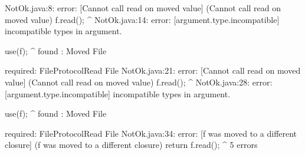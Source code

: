 \lstset{caption=New Mungo output}
\begin{code}
NotOk.java:8: error: [Cannot call read on moved value] (Cannot call read on moved value)
    f.read();
          ^
NotOk.java:14: error: [argument.type.incompatible] incompatible types in argument.

    use(f);
        ^
  found   : Moved File

  required: FileProtocol{Read} File
NotOk.java:21: error: [Cannot call read on moved value] (Cannot call read on moved value)
    f.read();
          ^
NotOk.java:28: error: [argument.type.incompatible] incompatible types in argument.

    use(f);
        ^
  found   : Moved File

  required: FileProtocol{Read} File
NotOk.java:34: error: [f was moved to a different closure] (f was moved to a different closure)
      return f.read();
             ^
5 errors
\end{code}

